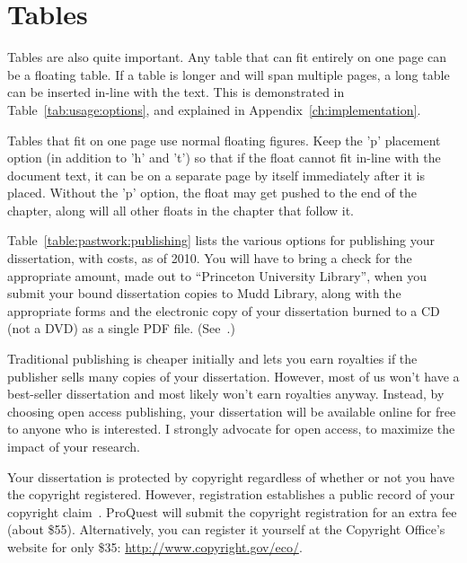 \section{Tables}
\label{sec:pastwork:tables}

Tables are also quite important. Any table that can fit entirely on one page can be a floating table. If a table is longer and will span multiple pages, a long table can be inserted in-line with the text. This is demonstrated in Table~\ref{tab:usage:options}, and explained in Appendix~\ref{ch:implementation}.

Tables that fit on one page use normal floating figures. Keep the 'p' placement option (in addition to 'h' and 't') so that if the float cannot fit in-line with the document text, it can be on a separate page by itself immediately after it is placed. Without the 'p' option, the float may get pushed to the end of the chapter, along will all other floats in the chapter that follow it.

Table~\ref{table:pastwork:publishing} lists the various options for publishing your dissertation, with costs, as of 2010. You will have to bring a check for the appropriate amount, made out to ``Princeton University Library'', when you submit your bound dissertation copies to Mudd Library, along with the appropriate forms and the electronic copy of your dissertation burned to a CD (not a DVD) as a single PDF file. (See~\cite{muddthesis2009}.)

Traditional publishing is cheaper initially and lets you earn royalties if the publisher sells many copies of your dissertation. However, most of us won't have a best-seller dissertation and most likely won't earn royalties anyway. Instead, by choosing open access publishing, your dissertation will be available online for free to anyone who is interested. I strongly advocate for open access, to maximize the impact of your research.

Your dissertation is protected by copyright regardless of whether or not you have the copyright registered. However, registration establishes a public record of your copyright claim~\cite{muddthesis2009}. ProQuest will submit the copyright registration for an extra fee (about \$55). Alternatively, you can register it yourself at the Copyright Office's website for only \$35: \url{http://www.copyright.gov/eco/}.


